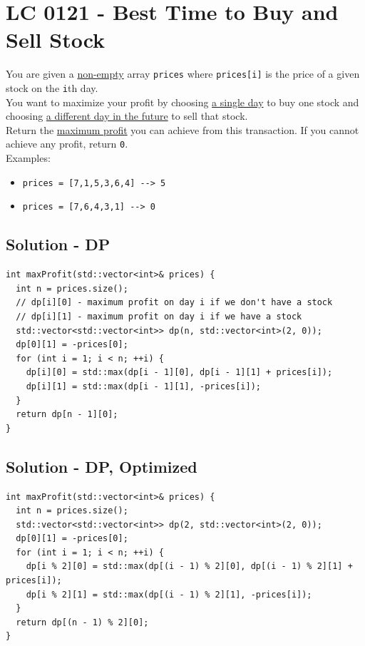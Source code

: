 \section{LC 0121 - Best Time to Buy and Sell Stock}
You are given a \ul{non-empty} array {\colorbox{CodeBackground}{\lstinline|prices|}} where {\colorbox{CodeBackground}{\lstinline|prices[i]|}} is the price of a given stock on the {\colorbox{CodeBackground}{\lstinline|i|}}th day.\\

You want to maximize your profit by choosing \ul{a single day} to buy one stock and choosing \ul{a different day in the future} to sell that stock.\\

Return the \ul{maximum profit} you can achieve from this transaction. If you cannot achieve any profit, return {\colorbox{CodeBackground}{\lstinline|0|}}.\\

Examples:
\begin{itemize}
	\item {\colorbox{CodeBackground}{\lstinline|prices = [7,1,5,3,6,4] --> 5|}}
	\item {\colorbox{CodeBackground}{\lstinline|prices = [7,6,4,3,1] --> 0|}}
\end{itemize}

\subsection*{Solution - DP}\label{solution:lc0121_dp}
\begin{lstlisting}
int maxProfit(std::vector<int>& prices) {
  int n = prices.size();
  // dp[i][0] - maximum profit on day i if we don't have a stock
  // dp[i][1] - maximum profit on day i if we have a stock
  std::vector<std::vector<int>> dp(n, std::vector<int>(2, 0));
  dp[0][1] = -prices[0];
  for (int i = 1; i < n; ++i) {
    dp[i][0] = std::max(dp[i - 1][0], dp[i - 1][1] + prices[i]);
    dp[i][1] = std::max(dp[i - 1][1], -prices[i]);
  }
  return dp[n - 1][0];
}
\end{lstlisting}

\subsection*{Solution - DP, Optimized}
\begin{lstlisting}
int maxProfit(std::vector<int>& prices) {
  int n = prices.size();
  std::vector<std::vector<int>> dp(2, std::vector<int>(2, 0));
  dp[0][1] = -prices[0];
  for (int i = 1; i < n; ++i) {
    dp[i % 2][0] = std::max(dp[(i - 1) % 2][0], dp[(i - 1) % 2][1] + prices[i]);
    dp[i % 2][1] = std::max(dp[(i - 1) % 2][1], -prices[i]);
  }
  return dp[(n - 1) % 2][0];
}
\end{lstlisting}

